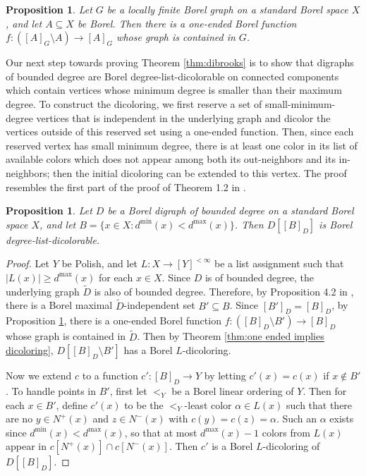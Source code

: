 \documentclass[psamsfonts]{amsart}
\newtheorem{prop}[thm]{Proposition}
\theoremstyle{definition}
\theoremstyle{remark}
\numberwithin{equation}{section}
\begin{document}
\begin{prop}
    \cite[Proposition~3.1]{cmt2016}
    \label{prop:one ended exists}
    Let $G$ be a locally finite Borel graph on a standard Borel space $X$, and let $A \subseteq X$ be Borel. Then there is a one-ended Borel function $f : ([A]_G \setminus A) \rightarrow [A]_G$ whose graph is contained in $G$.
\end{prop}

Our next step towards proving Theorem \ref{thm:dibrooks} is to show that digraphs of bounded degree are Borel degree-list-dicolorable on connected components which contain vertices whose minimum degree is smaller than their maximum degree. To construct the dicoloring, we first reserve a set of small-minimum-degree vertices that is independent in the underlying graph and dicolor the vertices outside of this reserved set using a one-ended function. Then, since each reserved vertex has small minimum degree, there is at least one color in its list of available colors which does not appear among both its out-neighbors and its in-neighbors; then the initial dicoloring can be extended to this vertex. The proof resembles the first part of the proof of Theorem 1.2 in \cite{cmt2016}.

\begin{prop}
\label{prop:small degree}
    Let $D$ be a Borel digraph of bounded degree on a standard Borel space $X$, and let $B = \{x \in X : d^{\min}(x) < d^{\max}(x) \}$. Then $D[[B]_D]$ is Borel degree-list-dicolorable.
\end{prop}

\begin{proof}
    Let $Y$ be Polish, and let $L : X \rightarrow [Y]^{< \infty}$ be a list assignment such that $\vert L(x) \vert \geq d^{\max}(x)$ for each $x \in X$. Since $D$ is of bounded degree, the underlying graph $\tilde{D}$ is also of bounded degree. Therefore, by Proposition 4.2 in \cite{kst1999}, there is a Borel maximal $\tilde{D}$-independent set $B' \subseteq B$. Since $[B']_D = [B]_D$, by Proposition \ref{prop:one ended exists}, there is a one-ended Borel function $f : ([B]_D \setminus B') \rightarrow [B]_D$ whose graph is contained in $\tilde{D}$. Then by Theorem \ref{thm:one ended implies dicoloring}, $D[[B]_{D} \setminus B']$ has a Borel $L$-dicoloring.

    Now we extend $c$ to a function $c' : [B]_{D} \rightarrow Y$ by letting $c'(x) = c(x)$ if $x \notin B'$. To handle points in $B'$, first let $<_Y$ be a Borel linear ordering of $Y$. Then for each $x \in B'$, define $c'(x)$ to be the $<_Y$-least color $\alpha \in L(x)$ such that there are no $y \in N^+(x)$ and $z \in N^-(x)$ with $c(y) = c(z) = \alpha$. Such an $\alpha$ exists since $d^{\min}(x) < d^{\max}(x)$, so that at most $d^{\max}(x) - 1$ colors from $L(x)$ appear in $c[N^+(x)] \cap c[N^-(x)]$. Then $c'$ is a Borel $L$-dicoloring of $D[[B]_D]$.
\end{proof}
\end{document}
